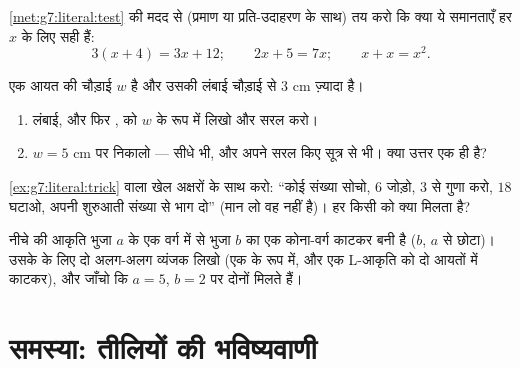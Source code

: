 \begin{exercise}[$\star\star$]\label{exo:g7:literal:8}
\cref{met:g7:literal:test} की मदद से (प्रमाण या प्रति-उदाहरण के
साथ) तय करो कि क्या ये समानताएँ हर $x$ के लिए सही हैं:
\[
3(x + 4) = 3x + 12; \qquad
2x + 5 = 7x; \qquad
x + x = x^2 .
\]
\end{exercise}

\begin{exercise}[$\star\star$]\label{exo:g7:literal:9}
एक आयत की चौड़ाई $w$ है और उसकी लंबाई चौड़ाई से $3$ cm ज़्यादा
है।
\begin{enumerate}
  \item लंबाई, और फिर , को $w$ के रूप में लिखो और सरल करो।
  \item $w = 5$ cm पर  निकालो --- सीधे भी, और अपने सरल किए
        सूत्र से भी। क्या उत्तर एक ही है?
\end{enumerate}
\end{exercise}

\begin{exercise}[$\star\star$]\label{exo:g7:literal:10}
\cref{ex:g7:literal:trick} वाला खेल अक्षरों के साथ करो: ``कोई
संख्या सोचो, $6$ जोड़ो, $3$ से गुणा करो, $18$ घटाओ, अपनी शुरुआती
संख्या से भाग दो'' (मान लो वह  नहीं है)। हर किसी को क्या
मिलता है?
\end{exercise}

\begin{exercise}[$\star\star\star$]\label{exo:g7:literal:11}
नीचे की आकृति भुजा $a$ के एक वर्ग में से भुजा $b$ का एक कोना-वर्ग
काटकर बनी है ($b$, $a$ से छोटा)। उसके  के लिए दो
अलग-अलग व्यंजक लिखो (एक  के रूप में, और एक L-आकृति को दो आयतों
में काटकर), और जाँचो कि $a = 5$, $b = 2$ पर दोनों मिलते हैं।
\end{exercise}

\section{समस्या: तीलियों की भविष्यवाणी}

